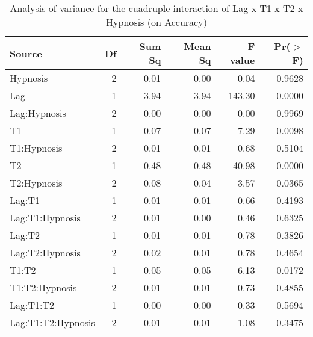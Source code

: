 \documentclass{article}
\begin{document}


\begin{table}
\caption{Analysis of variance for the cuadruple interaction of Lag x T1 x T2 x Hypnosis (on Accuracy)}
\centering
\begin{tabular}{lrrrrr}
  \hline
 Source & Df & Sum Sq & Mean Sq & F value & Pr($>$F) \\ 
  \hline
Hypnosis    & 2 & 0.01 & 0.00 & 0.04 & 0.9628 \\ 
  \rowcolor{Gray}
  Lag        & 1 & 3.94 & 3.94 & 143.30 & 0.0000 \\ 
  Lag:Hypnosis & 2 & 0.00 & 0.00 & 0.00 & 0.9969 \\
  \rowcolor{Gray}
  T1        & 1 & 0.07 & 0.07 & 7.29 & 0.0098 \\ 
  T1:Hypnosis & 2 & 0.01 & 0.01 & 0.68 & 0.5104 \\
  \rowcolor{Gray}
  T2        & 1 & 0.48 & 0.48 & 40.98 & 0.0000 \\
  \rowcolor{Gray}
  T2:Hypnosis & 2 & 0.08 & 0.04 & 3.57 & 0.0365 \\ 
  Lag:T1        & 1 & 0.01 & 0.01 & 0.66 & 0.4193 \\ 
  Lag:T1:Hypnosis & 2 & 0.01 & 0.00 & 0.46 & 0.6325 \\ 
  Lag:T2        & 1 & 0.01 & 0.01 & 0.78 & 0.3826 \\ 
  Lag:T2:Hypnosis & 2 & 0.02 & 0.01 & 0.78 & 0.4654 \\
  \rowcolor{Gray}
  T1:T2        & 1 & 0.05 & 0.05 & 6.13 & 0.0172 \\ 
  T1:T2:Hypnosis & 2 & 0.01 & 0.01 & 0.73 & 0.4855 \\ 
  Lag:T1:T2        & 1 & 0.00 & 0.00 & 0.33 & 0.5694 \\ 
  Lag:T1:T2:Hypnosis & 2 & 0.01 & 0.01 & 1.08 & 0.3475 \\ 
   \hline
\end{tabular}
\end{table}
\end{document}
